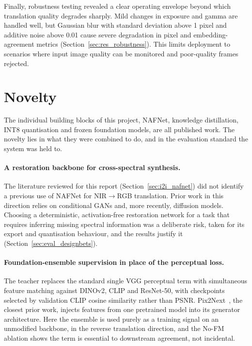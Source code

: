 Finally, robustness testing revealed a clear operating envelope beyond which translation quality degrades sharply. Mild changes in exposure and gamma are handled well, but Gaussian blur with standard deviation above 1 pixel and additive noise above 0.01 cause severe degradation in pixel and embedding-agreement metrics (Section~\ref{sec:res_robustness}). This limits deployment to scenarios where input image quality can be monitored and poor-quality frames rejected.

\section{Novelty}
\label{sec:eval_novelty}

The individual building blocks of this project, NAFNet, knowledge distillation, INT8 quantisation and frozen foundation models, are all published work. The novelty lies in what they were combined to do, and in the evaluation standard the system was held to.

\paragraph{A restoration backbone for cross-spectral synthesis.}
The literature reviewed for this report (Section~\ref{sec:i2i_nafnet}) did not identify a previous use of NAFNet for NIR$\rightarrow$RGB translation. Prior work in this direction relies on conditional GANs and, more recently, diffusion models. Choosing a deterministic, activation-free restoration network for a task that requires inferring missing spectral information was a deliberate risk, taken for its export and quantisation behaviour, and the results justify it (Section~\ref{sec:eval_designbets}).

\paragraph{Foundation-ensemble supervision in place of the perceptual loss.}
The teacher replaces the standard single VGG perceptual term with simultaneous feature matching against DINOv2, CLIP and ResNet-50, with checkpoints selected by validation CLIP cosine similarity rather than PSNR. Pix2Next~\cite{pix2next2024}, the closest prior work, injects features from one pretrained model into its generator architecture. Here the ensemble is used purely as a training signal on an unmodified backbone, in the reverse translation direction, and the No-FM ablation shows the term is essential to downstream agreement, not incidental.

